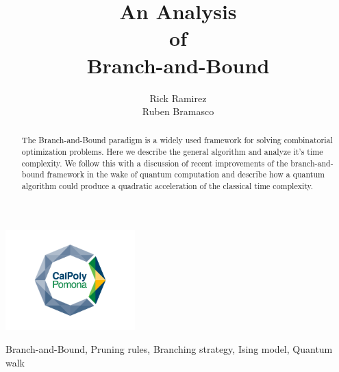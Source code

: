\documentclass[]{IEEEphot}
\begin{document}
	
	\title{An Analysis\\ of \\ Branch-and-Bound}
	
	\author{Rick Ramirez \\ Ruben Bramasco}
	
	\maketitle
	\vspace{-2cm}
	\begin{center}
    	\includegraphics[width=5cm]{images/primary-logo-inside-stacked}\\
    \end{center}
	\vspace{0.25cm}

	\begin{abstract}
		\doublespacing\small
		The Branch-and-Bound paradigm is a widely used framework for solving combinatorial optimization problems.
		Here we describe the general algorithm and analyze it's time complexity.
		We follow this with a discussion of recent improvements of the branch-and-bound framework in the wake of quantum computation and describe how a quantum algorithm could produce a quadratic acceleration of the classical time complexity.
	\end{abstract}

	\begin{IEEEkeywords}
		Branch-and-Bound, Pruning rules, Branching strategy, Ising model, Quantum walk
	\end{IEEEkeywords}


	
	
	
	
	
	
	
	
	
	
	\cite{montanaro2020quantum, kempe2003quantum, lucas2014ising, mitCourse, techie}
	
	
	
	
	
	
	
	
\end{document}
